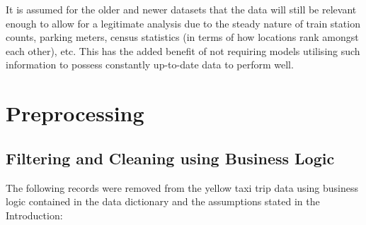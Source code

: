 \documentclass[11pt]{article}
\begin{document}
It is assumed for the older and newer datasets that the data will still be relevant enough to allow for a legitimate analysis due to the steady nature of train station counts, parking meters, census statistics (in terms of how locations rank amongst each other), etc. This has the added benefit of not requiring models utilising such information to possess constantly up-to-date data to perform well.


\section{Preprocessing}
\subsection{Filtering and Cleaning using Business Logic}
The following records were removed from the yellow taxi trip data using business logic contained in the data dictionary \cite{taxidatadict} and the assumptions stated in the Introduction:
\end{document}
